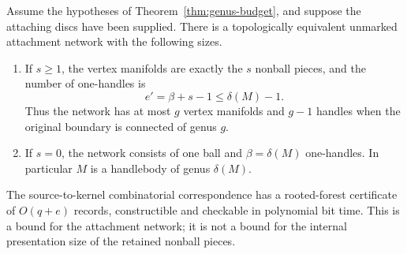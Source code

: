 \begin{theorem}
\label{thm:attachment-kernel}
Assume the hypotheses of Theorem~\ref{thm:genus-budget}, and suppose the
attaching discs have been supplied.  There is a topologically equivalent
unmarked attachment network with the following sizes.
\begin{enumerate}[label=(\roman*)]
\item If $s\geq1$, the vertex manifolds are exactly the $s$ nonball
pieces, and the number of one-handles is
\begin{equation}
             e'=\beta+s-1\leq\delta(M)-1.
             \label{eq:kernel-edge-count}
\end{equation}
Thus the network has at most $g$ vertex manifolds and $g-1$ handles when
the original boundary is connected of genus $g$.
\item If $s=0$, the network consists of one ball and $\beta=\delta(M)$
one-handles.  In particular $M$ is a handlebody of genus $\delta(M)$.
\end{enumerate}
The source-to-kernel combinatorial correspondence has a rooted-forest
certificate of $O(q+e)$ records, constructible and checkable in polynomial
bit time.  This is a bound for the attachment network; it is not a bound
for the internal presentation size of the retained nonball pieces.
\end{theorem}
